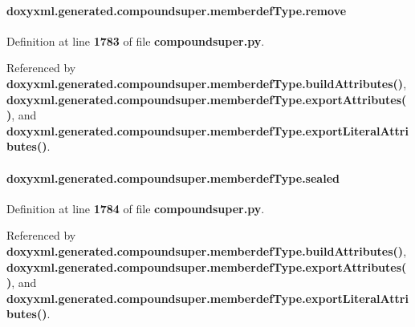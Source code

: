 \paragraph[{remove}]{\setlength{\rightskip}{0pt plus 5cm}doxyxml.\+generated.\+compoundsuper.\+memberdef\+Type.\+remove}\label{classdoxyxml_1_1generated_1_1compoundsuper_1_1memberdefType_a7aec761e9c1f5e50d71544bfa4cb8c3e}


Definition at line {\bf 1783} of file {\bf compoundsuper.\+py}.



Referenced by {\bf doxyxml.\+generated.\+compoundsuper.\+memberdef\+Type.\+build\+Attributes()}, {\bf doxyxml.\+generated.\+compoundsuper.\+memberdef\+Type.\+export\+Attributes()}, and {\bf doxyxml.\+generated.\+compoundsuper.\+memberdef\+Type.\+export\+Literal\+Attributes()}.

\paragraph[{sealed}]{\setlength{\rightskip}{0pt plus 5cm}doxyxml.\+generated.\+compoundsuper.\+memberdef\+Type.\+sealed}\label{classdoxyxml_1_1generated_1_1compoundsuper_1_1memberdefType_a32815ec4aeca41caff428bf76315ca45}


Definition at line {\bf 1784} of file {\bf compoundsuper.\+py}.



Referenced by {\bf doxyxml.\+generated.\+compoundsuper.\+memberdef\+Type.\+build\+Attributes()}, {\bf doxyxml.\+generated.\+compoundsuper.\+memberdef\+Type.\+export\+Attributes()}, and {\bf doxyxml.\+generated.\+compoundsuper.\+memberdef\+Type.\+export\+Literal\+Attributes()}.


